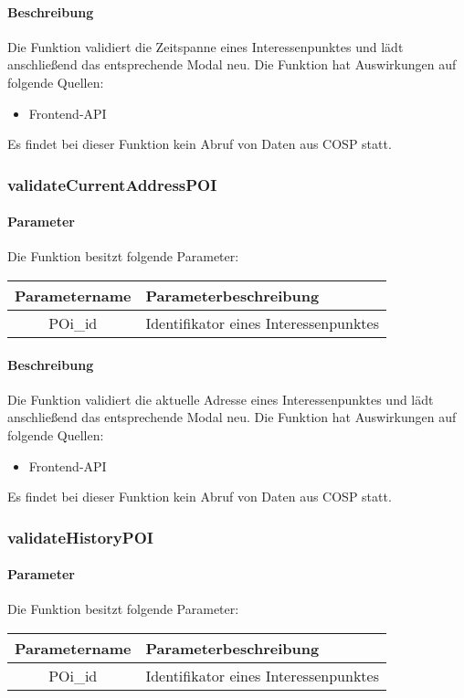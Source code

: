 \paragraph{Beschreibung} Die Funktion validiert die Zeitspanne eines Interessenpunktes und lädt anschließend das entsprechende Modal neu. Die Funktion hat Auswirkungen auf folgende Quellen:
\begin{itemize}
	\item Frontend-API
\end{itemize}
Es findet bei dieser Funktion kein Abruf von Daten aus {\glqq COSP\grqq} statt.
\subsubsection{validateCurrentAddressPOI}
\paragraph{Parameter} Die Funktion besitzt folgende Parameter:
\begin{table}[H]
	\begin{tabular}{|c|p{11cm}|}
		\hline
		\textbf{Parametername} & \textbf{Parameterbeschreibung} \\ \hline
		POi\_id & Identifikator eines Interessenpunktes \\ \hline
	\end{tabular}
\end{table}
\paragraph{Beschreibung} Die Funktion validiert die aktuelle Adresse eines Interessenpunktes und lädt anschließend das entsprechende Modal neu. Die Funktion hat Auswirkungen auf folgende Quellen:
\begin{itemize}
	\item Frontend-API
\end{itemize}
Es findet bei dieser Funktion kein Abruf von Daten aus {\glqq COSP\grqq} statt.
\subsubsection{validateHistoryPOI}
\paragraph{Parameter} Die Funktion besitzt folgende Parameter:
\begin{table}[H]
	\begin{tabular}{|c|p{11cm}|}
		\hline
		\textbf{Parametername} & \textbf{Parameterbeschreibung} \\ \hline
		POi\_id & Identifikator eines Interessenpunktes \\ \hline
	\end{tabular}
\end{table}
